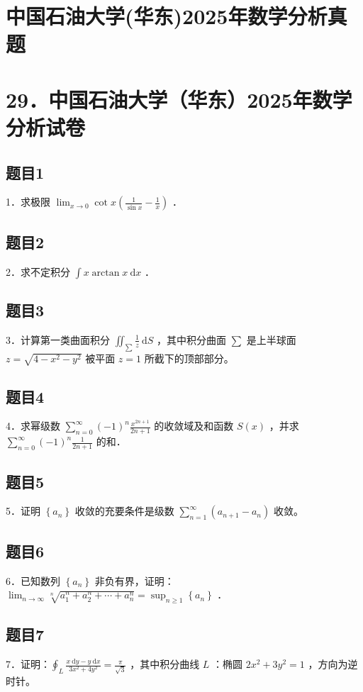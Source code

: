 \documentclass{article}
\begin{document}
\section*{中国石油大学(华东)2025年数学分析真题}
\section*{29．中国石油大学（华东）2025年数学分析试卷}

\subsection{题目1}
1．求极限 \(\lim _{x \rightarrow 0} \cot x\left(\frac{1}{\sin x}-\frac{1}{x}\right)\) ．

\subsection{题目2}
2．求不定积分 \(\int x \arctan x \mathrm{~d} x\) ．

\subsection{题目3}
3．计算第一类曲面积分 \(\iint_{\sum} \frac{1}{z} \mathrm{~d} S\) ，其中积分曲面 \(\sum\) 是上半球面 \(z=\sqrt{4-x^{2}-y^{2}}\) 被平面 \(z=1\) 所截下的顶部部分。

\subsection{题目4}
4．求幂级数 \(\sum_{n=0}^{\infty}(-1)^{n} \frac{x^{2 n+1}}{2 n+1}\) 的收敛域及和函数 \(S(x)\) ，并求 \(\sum_{n=0}^{\infty}(-1)^{n} \frac{1}{2 n+1}\) 的和．

\subsection{题目5}
5．证明 \(\left\{a_{n}\right\}\) 收敛的充要条件是级数 \(\sum_{n=1}^{\infty}\left(a_{n+1}-a_{n}\right)\) 收敛。

\subsection{题目6}
6．已知数列 \(\left\{a_{n}\right\}\) 非负有界，证明： \(\lim _{n \rightarrow \infty} \sqrt[n]{a_{1}^{n}+a_{2}^{n}+\cdots+a_{n}^{n}}=\sup _{n \geq 1}\left\{a_{n}\right\}\) ．

\subsection{题目7}
7．证明：\(\oint_{L} \frac{x \mathrm{~d} y-y \mathrm{~d} x}{3 x^{2}+4 y^{2}}=\frac{\pi}{\sqrt{3}}\) ，其中积分曲线 \(L\) ：椭圆 \(2 x^{2}+3 y^{2}=1\) ，方向为逆时针。
\end{document}
